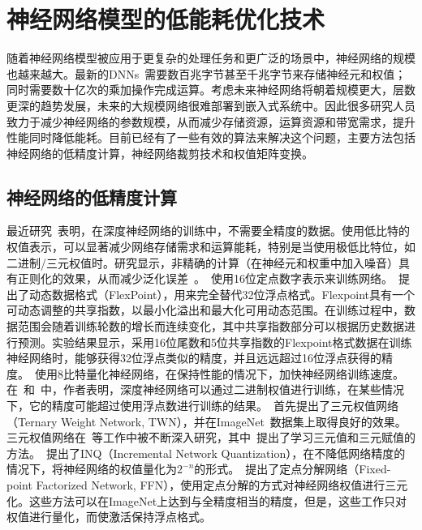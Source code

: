 \section{神经网络模型的低能耗优化技术}
随着神经网络模型被应用于更复杂的处理任务和更广泛的场景中，神经网络的规模也越来越大。最新的DNNs~\cite{le2013building, coates2013deep}需要数百兆字节甚至千兆字节来存储神经元和权值；同时需要数十亿次的乘加操作完成运算。考虑未来神经网络将朝着规模更大，层数更深的趋势发展，未来的大规模网络很难部署到嵌入式系统中。因此很多研究人员致力于减少神经网络的参数规模，从而减少存储资源，运算资源和带宽需求，提升性能同时降低能耗。目前已经有了一些有效的算法来解决这个问题，主要方法包括神经网络的低精度计算，神经网络裁剪技术和权值矩阵变换。

\subsection{神经网络的低精度计算}

最近研究~\cite{gupta2015deep}表明，在深度神经网络的训练中，不需要全精度的数据。使用低比特的权值表示，可以显著减少网络存储需求和运算能耗，特别是当使用极低比特位，如二进制/三元权值时。研究显示，非精确的计算（在神经元和权重中加入噪音）具有正则化的效果，从而减少泛化误差~\cite{goodfellow2016deep}。~\citet{gupta2015deep}使用16位定点数字表示来训练网络。~\citet{koster2017flexpoint}提出了动态数据格式（FlexPoint），用来完全替代32位浮点格式。Flexpoint具有一个可动态调整的共享指数，以最小化溢出和最大化可用动态范围。在训练过程中，数据范围会随着训练轮数的增长而连续变化，其中共享指数部分可以根据历史数据进行预测。实验结果显示，采用16位尾数和5位共享指数的Flexpoint格式数据在训练神经网络时，能够获得32位浮点类似的精度，并且远远超过16位浮点获得的精度。~\citet{dettmers20158}使用8比特量化神经网络，在保持性能的情况下，加快神经网络训练速度。在~\cite{courbariaux2015binaryconnect}和~\cite{hu2018hashing}中，作者表明，深度神经网络可以通过二进制权值进行训练，在某些情况下，它的精度可能超过使用浮点数进行训练的结果。~\citet{rastegari2016xnor}首先提出了三元权值网络（Ternary Weight Network, TWN），并在ImageNet~\cite{russakovsky2015imagenet}数据集上取得良好的效果。三元权值网络在~\cite{li2016ternary,zhu2016trained}等工作中被不断深入研究，其中~\cite{zhu2016trained}提出了学习三元值和三元赋值的方法。~\citet{zhou2017incremental}提出了INQ（Incremental Network Quantization），在不降低网络精度的情况下，将神经网络的权值量化为$2^{-n}$的形式。~\citet{wang2017fixed}提出了定点分解网络（Fixed-point Factorized Network, FFN），使用定点分解的方式对神经网络权值进行三元化。这些方法可以在ImageNet上达到与全精度相当的精度，但是，这些工作只对权值进行量化，而使激活保持浮点格式。

